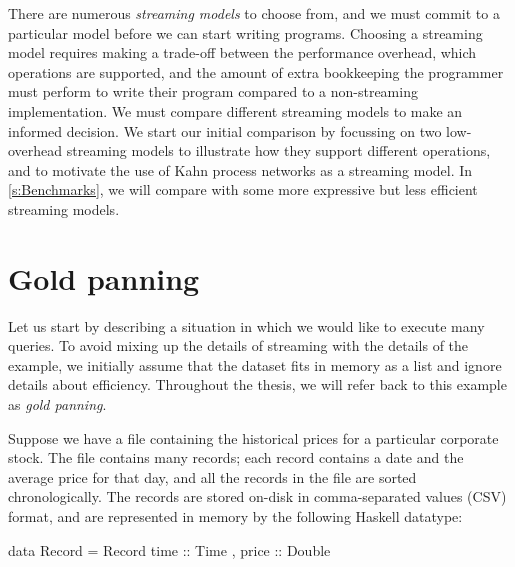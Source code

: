 There are numerous \emph{streaming models} to choose from, and we must commit to a particular model before we can start writing programs.
Choosing a streaming model requires making a trade-off between the performance overhead, which operations are supported, and the amount of extra bookkeeping the programmer must perform to write their program compared to a non-streaming implementation.
We must compare different streaming models to make an informed decision.
We start our initial comparison by focussing on two low-overhead streaming models to illustrate how they support different operations, and to motivate the use of Kahn process networks as a streaming model.
In \cref{s:Benchmarks}, we will compare with some more expressive but less efficient streaming models.

\section{Gold panning}
\label{taxonomy/gold-panning}
Let us start by describing a situation in which we would like to execute many queries.
To avoid mixing up the details of streaming with the details of the example, we initially assume that the dataset fits in memory as a list and ignore details about efficiency.
Throughout the thesis, we will refer back to this example as \emph{gold panning}.

Suppose we have a file containing the historical prices for a particular corporate stock.
The file contains many records; each record contains a date and the average price for that day, and all the records in the file are sorted chronologically.
The records are stored on-disk in comma-separated values (CSV) format, and are represented in memory by the following Haskell datatype:

\begin{haskell}
data Record = Record
 { time  :: Time
 , price :: Double }
\end{haskell}

